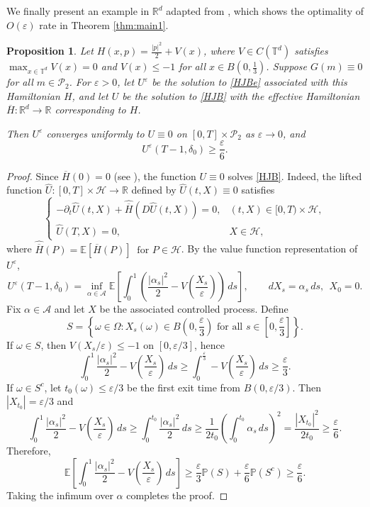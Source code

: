 \documentclass[reqno,11pt]{amsart}
\newtheorem{proposition}[theorem]{Proposition}
\numberwithin{equation}{section}
\newcommand{\R}{\mathbb{R}} %
\newcommand{\e}{\varepsilon}
\newcommand{\ep}{\varepsilon}
\newcommand{\nd}{\noindent}
\renewcommand{\hat}{\widehat}
\renewcommand{\bar}{\overline}
\begin{document}
\nd
We finally present an example in $\R^d$ adapted from \cite[Proposition 4.3]{MitakeTranYu2019}, which shows the optimality of $O(\e)$ rate in Theorem \ref{thm:main1}.
\begin{proposition}\label{prop:opex}
Let $H(x,p)=\frac{|p|^2}{2}+V(x)$, where $V\in C(\mathbb{T}^d)$ satisfies $\max_{x\in \mathbb{T}^d} V(x)=0$ and $V(x)\leq -1$ for all $x\in B\left(0,\frac{1}{3}\right)$. Suppose $G(m)\equiv 0$ for all $m\in \mathcal{P}_2$. For $\varepsilon>0$, let $U^\varepsilon$ be the solution to \eqref{HJBe} associated with this Hamiltonian $H$, and let $U$ be the solution to \eqref{HJB} with the effective Hamiltonian $\bar{H}:\mathbb{R}^d\to\mathbb{R}$ corresponding to $H$.

Then $U^\varepsilon$ converges uniformly to $U\equiv 0$ on $[0,T]\times \mathcal{P}_2$ as $\varepsilon\to 0$, and
    \[
    U^\ep(T-1,\delta_0) \geq \frac{\e}{6}.
    \]
\end{proposition}
\begin{proof}
Since $\bar H(0)=0$ (see \cite[Lemma 4.21]{tran_hamilton-jacobi_2021}), the function $U\equiv 0$ solves \eqref{HJB}. Indeed, the lifted function $\hat{U} : [0,T] \times \mathcal{H} \to \mathbb{R}$ defined by $\hat{U}(t,X) \equiv 0$ satisfies
\[ \begin{cases}
-\partial_t \hat{U}(t,X) + \hat{\bar{H}}(D\hat{U}(t,X)) = 0, & (t,X) \in [0,T) \times \mathcal{H}, \\ \hat{U}(T,X) = 0, & X \in \mathcal{H},
\end{cases}
\]
where $\hat{\bar{H}}(P)=\mathbb{E}[\bar{H}(P)]\;\; \text{for }P\in \mathcal{H}$. By the value function representation of $U^\e$,
\[
U^\e(T-1,\delta_0)
=\inf_{\alpha\in\mathcal A} \mathbb{E}\left[\int_0^1 \left(\frac{|\alpha_s|^2}{2}-V \left(\frac{X_s}{\e}\right)\right)\,ds\right],
\qquad dX_s=\alpha_s\,ds,\ \ X_0=0.
\]
Fix $\alpha\in\mathcal A$ and let $X$ be the associated controlled process. Define
\[
S=\left\{\omega\in\Omega: X_s(\omega) \in B\left(0, \frac{\ep}{3}\right) \text{ for all } s \in \left[0, \frac{\e}{3}\right]\right\}.
\]
If $\omega\in S$, then $V(X_s/\e)\le -1$ on $[0,\e/3]$, hence
\[
\int_0^1 \frac{\left|\alpha_s\right|^2}{2}-V\left(\frac{X_s}{\e}\right)\,ds \geq  \int_0^\frac{\ep}{3}-V\left(\frac{X_s}{\e}\right)\,ds \geq \frac{\e}{3}.
\]
If $\omega\in S^c$, let $t_0(\omega)\le \e/3$ be the first exit time from $B(0,\e/3)$. Then $|X_{t_0}|=\e/3$ and
\[
\int_0^1 \frac{\left|\alpha_s\right|^2}{2}-V\left(\frac{X_s}{\e}\right)\,ds \geq  \int_0^{t_0}\frac{\left|\alpha_s\right|^2}{2}\,ds \geq \frac{1}{2t_0} \left(\int_0^{t_0} \alpha_s\,ds\right)^2 =\frac{\left|X_{t_0}\right|^2}{2t_0} \geq \frac{\e}{6}.
\]
Therefore,
\[
\mathbb{E}\left[\int_0^1 \frac{\left|\alpha_s\right|^2}{2}-V\left(\frac{X_s}{\e}\right)\,ds \right] \geq \frac{\e}{3}\mathbb{P}\left(S\right)+\frac{\e}{6}\mathbb{P}\left(S^c\right) \geq \frac{\e}{6}.
\]
Taking the infimum over $\alpha$ completes the proof.
\end{proof}
\end{document}
